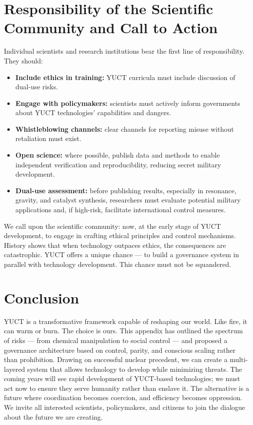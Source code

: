 \documentclass[12pt,a4paper]{article}
\theoremstyle{remark}
\begin{document}
	\section{Responsibility of the Scientific Community and Call to Action}
	\label{sec:scientists}
	
	Individual scientists and research institutions bear the first line of responsibility. They should:
	\begin{itemize}[leftmargin=*]
		\item \textbf{Include ethics in training:} YUCT curricula must include discussion of dual-use risks.
		\item \textbf{Engage with policymakers:} scientists must actively inform governments about YUCT technologies' capabilities and dangers.
		\item \textbf{Whistleblowing channels:} clear channels for reporting misuse without retaliation must exist.
		\item \textbf{Open science:} where possible, publish data and methods to enable independent verification and reproducibility, reducing secret military development.
		\item \textbf{Dual-use assessment:} before publishing results, especially in resonance, gravity, and catalyst synthesis, researchers must evaluate potential military applications and, if high-risk, facilitate international control measures.
	\end{itemize}
	
	We call upon the scientific community: now, at the early stage of YUCT development, to engage in crafting ethical principles and control mechanisms. History shows that when technology outpaces ethics, the consequences are catastrophic. YUCT offers a unique chance — to build a governance system in parallel with technology development. This chance must not be squandered.
	
	\section{Conclusion}
	\label{sec:conclusion}
	
	YUCT is a transformative framework capable of reshaping our world. Like fire, it can warm or burn. The choice is ours. This appendix has outlined the spectrum of risks — from chemical manipulation to social control — and proposed a governance architecture based on control, parity, and conscious scaling rather than prohibition. Drawing on successful nuclear precedent, we can create a multi-layered system that allows technology to develop while minimizing threats. The coming years will see rapid development of YUCT-based technologies; we must act now to ensure they serve humanity rather than enslave it. The alternative is a future where coordination becomes coercion, and efficiency becomes oppression. We invite all interested scientists, policymakers, and citizens to join the dialogue about the future we are creating.
	
\end{document}
